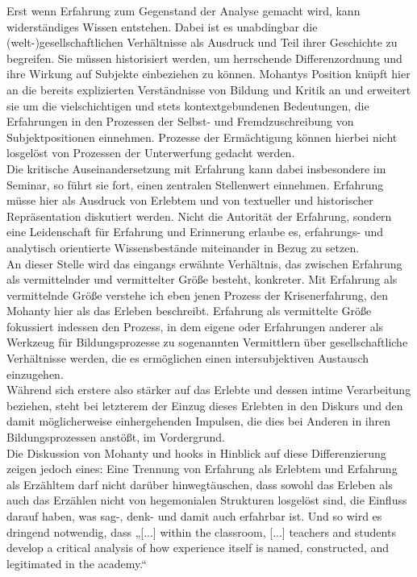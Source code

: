 \noindent Erst wenn Erfahrung zum Gegenstand der Analyse gemacht wird, kann
widerständiges Wissen entstehen. Dabei ist es unabdingbar die
(welt-)gesellschaftlichen Verhältnisse als Ausdruck und Teil ihrer Geschichte
zu begreifen. Sie müssen historisiert werden, um herrschende Differenzordnung
und ihre Wirkung auf Subjekte einbeziehen zu können. Mohantys Position knüpft
hier an die bereits explizierten Verständnisse von Bildung und Kritik an und
erweitert sie um die vielschichtigen und stets kontextgebundenen Bedeutungen,
die Erfahrungen in den Prozessen der Selbst- und Fremdzuschreibung von
Subjektpositionen einnehmen. Prozesse der Ermächtigung können hierbei nicht
losgelöst von Prozessen der Unterwerfung gedacht werden.\\
Die kritische Auseinandersetzung mit Erfahrung kann dabei insbesondere im
Seminar, so führt sie fort, einen zentralen Stellenwert einnehmen. Erfahrung
müsse hier als Ausdruck von Erlebtem und von textueller und historischer
Repräsentation diskutiert werden. Nicht die Autorität der Erfahrung, sondern
eine Leidenschaft für Erfahrung und Erinnerung erlaube es, erfahrungs- und
analytisch orientierte Wissensbestände miteinander in Bezug zu
setzen.\footnotemark{}\\

\noindent An dieser Stelle wird das eingangs erwähnte Verhältnis, das zwischen Erfahrung
als vermittelnder und vermittelter Größe besteht, konkreter. Mit Erfahrung als
vermittelnde Größe verstehe ich eben jenen Prozess der Krisenerfahrung, den
Mohanty hier als das Erleben beschreibt. Erfahrung als vermittelte Größe
fokussiert indessen den Prozess, in dem eigene oder Erfahrungen anderer als
Werkzeug für Bildungsprozesse zu sogenannten Vermittlern über gesellschaftliche
Verhältnisse werden, die es ermöglichen einen intersubjektiven Austausch
einzugehen.\\
Während sich erstere also stärker auf das Erlebte und dessen intime
Verarbeitung beziehen, steht bei letzterem der Einzug dieses Erlebten in den
Diskurs und den damit möglicherweise einhergehenden Impulsen, die dies bei
Anderen in ihren Bildungsprozessen anstößt, im Vordergrund.\\

\noindent Die Diskussion von Mohanty und hooks in Hinblick auf diese Differenzierung
zeigen jedoch eines: Eine Trennung von Erfahrung als Erlebtem und Erfahrung als
Erzähltem darf nicht darüber hinwegtäuschen, dass sowohl das Erleben als auch
das Erzählen nicht von hegemonialen Strukturen losgelöst sind, die Einfluss
darauf haben, was sag-,  denk- und damit auch erfahrbar ist. Und so wird es
dringend notwendig, dass „[...] within the classroom, [...] teachers and
students develop a critical analysis of how experience itself is named,
constructed, and legitimated in the academy.“\footnotemark{}\\

